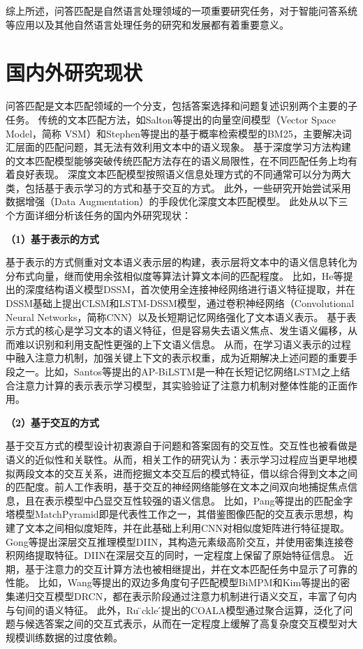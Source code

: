 综上所述，问答匹配是自然语言处理领域的一项重要研究任务，对于智能问答系统等应用以及其他自然语言处理任务的研究和发展都有着重要意义。

\section{国内外研究现状}

问答匹配是文本匹配领域的一个分支，包括答案选择和问题复述识别两个主要的子任务。
传统的文本匹配方法，如Salton等提出的向量空间模型（Vector Space Model，简称 VSM）\cite{salton1975vector}和Stephen等提出的基于概率检索模型的BM25\cite{robertson1994some}，主要解决词汇层面的匹配问题，其无法有效利用文本中的语义现象。
基于深度学习方法构建的文本匹配模型能够突破传统匹配方法存在的语义局限性，在不同匹配任务上均有着良好表现。
深度文本匹配模型按照语义信息处理方式的不同通常可以分为两大类，包括基于表示学习的方式和基于交互的方式。
此外，一些研究开始尝试采用数据增强（Data Augmentation）的手段优化深度文本匹配模型。
此处从以下三个方面详细分析该任务的国内外研究现状：

\textbf{\songti （1）基于表示的方式}

基于表示的方式侧重对文本语义表示层的构建，表示层将文本中的语义信息转化为分布式向量，继而使用余弦相似度等算法计算文本间的匹配程度。
比如，He等提出的深度结构语义模型DSSM\cite{huang2013learning}，首次使用全连接神经网络进行语义特征提取，并在DSSM基础上提出CLSM\cite{shen2014latent}和LSTM-DSSM\cite{palangi2014semantic}模型，通过卷积神经网络（Convolutional Neural Networks，简称CNN）\cite{krizhevsky2012imagenet}以及长短期记忆网络强化了文本语义表示。
基于表示方式的核心是学习文本的语义特征，但是容易失去语义焦点、发生语义偏移，从而难以识别和利用支配性更强的上下文语义信息。
从而，在学习语义表示的过程中融入注意力机制，加强关键上下文的表示权重，成为近期解决上述问题的重要手段之一。比如，Santos等提出的AP-BiLSTM\cite{santos2016attentive}是一种在长短记忆网络LSTM之上结合注意力计算的表示表示学习模型，其实验验证了注意力机制对整体性能的正面作用。

\textbf{\songti （2）基于交互的方式}

基于交互方式的模型设计初衷源自于问题和答案固有的交互性。交互性也被看做是语义的近似性和关联性。从而，相关工作的研究认为：表示学习过程应当更早地模拟两段文本的交互关系，进而挖掘文本交互后的模式特征，借以综合得到文本之间的匹配度。前人工作表明，基于交互的神经网络能够在文本之间双向地捕捉焦点信息，且在表示模型中凸显交互性较强的语义信息。
比如，Pang等提出的匹配金字塔模型MatchPyramid\cite{pang2016text}即是代表性工作之一，其借鉴图像匹配的交互表示思想，构建了文本之间相似度矩阵，并在此基础上利用CNN对相似度矩阵进行特征提取。Gong等提出深层交互推理模型DIIN\cite{gong2017natural}，其构造元素级高阶交互，并使用密集连接卷积网络提取特征。DIIN在深层交互的同时，一定程度上保留了原始特征信息。
近期，基于注意力的交互计算方法也被相继提出，并在文本匹配任务中显示了可靠的性能。
比如，Wang等提出的双边多角度句子匹配模型BiMPM\cite{wang2017bilateral}和Kim等提出的密集递归交互模型DRCN\cite{kim2019semantic}，都在表示阶段通过注意力机制进行语义交互，丰富了句内与句间的语义特征。
此外，Ru ̈ckle ́提出的COALA\cite{ruckle2019coala}模型通过聚合运算，泛化了问题与候选答案之间的交互式表示，从而在一定程度上缓解了高复杂度交互模型对大规模训练数据的过度依赖。

